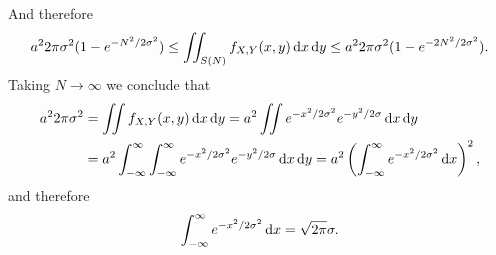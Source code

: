 \begin{exercise}
\begin{solution}
And therefore
\begin{equation}
a^{2}2\pi{\sigma^{2}} (1-e^{-N^{2}/2\sigma^{2}}) \leq
  \iint_{S(N)}f_{X,Y}(x,y) \,\textrm{d}x\,\textrm{d}y \leq
a^{2}2\pi{\sigma^{2}} (1-e^{-2N^{2}/2\sigma^{2}}).
\end{equation}
Taking $N\to\infty$ we conclude that
\begin{align}
a^{2}2\pi{\sigma^{2}}
&=\iint f_{X,Y}(x,y) \,\textrm{d}x\,\textrm{d}y
=a^{2}  \iint e^{-x^{2}/2\sigma^{2}} e^{-y^{2}/2\sigma} \,\textrm{d}x\,\textrm{d}y\\
&=a^{2}  \int_{-\infty}^{\infty} \int_{-\infty}^{\infty }e^{-x^{2}/2\sigma^{2}} e^{-y^{2}/2\sigma} \,\textrm{d}x\,\textrm{d}y
=a^{2} \left( \int_{-\infty}^{\infty }e^{-x^{2}/2\sigma^{2}} \,\textrm{d}x\right)^{2},
\end{align}
and therefore
\begin{equation}
\label{eq:18}
\int_{-\infty}^{\infty }e^{-x^{2}/2\sigma^{2}} \,\textrm{d}x = \sqrt{2 \pi}\sigma.
\end{equation}
\end{solution}
\end{exercise}


